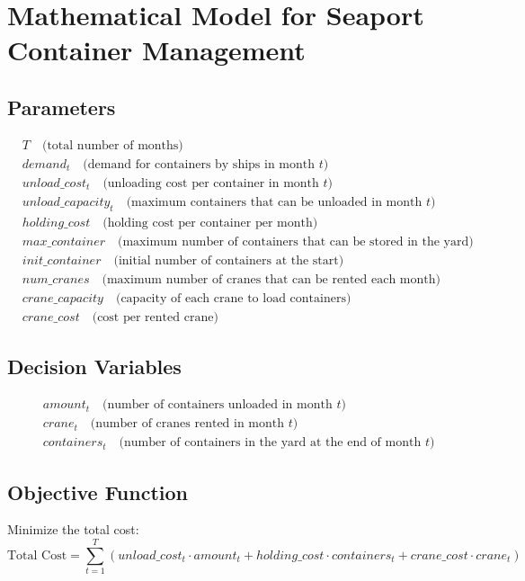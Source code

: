 \documentclass{article}
\begin{document}
\section*{Mathematical Model for Seaport Container Management}

\subsection*{Parameters}
\begin{align*}
& T \quad \text{(total number of months)} \\
& demand_t \quad \text{(demand for containers by ships in month } t) \\
& unload\_cost_t \quad \text{(unloading cost per container in month } t) \\
& unload\_capacity_t \quad \text{(maximum containers that can be unloaded in month } t) \\
& holding\_cost \quad \text{(holding cost per container per month)} \\
& max\_container \quad \text{(maximum number of containers that can be stored in the yard)} \\
& init\_container \quad \text{(initial number of containers at the start)} \\
& num\_cranes \quad \text{(maximum number of cranes that can be rented each month)} \\
& crane\_capacity \quad \text{(capacity of each crane to load containers)} \\
& crane\_cost \quad \text{(cost per rented crane)}
\end{align*}

\subsection*{Decision Variables}
\begin{align*}
& amount_t \quad \text{(number of containers unloaded in month } t) \\
& crane_t \quad \text{(number of cranes rented in month } t) \\
& containers_t \quad \text{(number of containers in the yard at the end of month } t)
\end{align*}

\subsection*{Objective Function}
Minimize the total cost:
\[
\text{Total Cost} = \sum_{t=1}^{T} \left( unload\_cost_t \cdot amount_t + holding\_cost \cdot containers_t + crane\_cost \cdot crane_t \right)
\]
\end{document}

